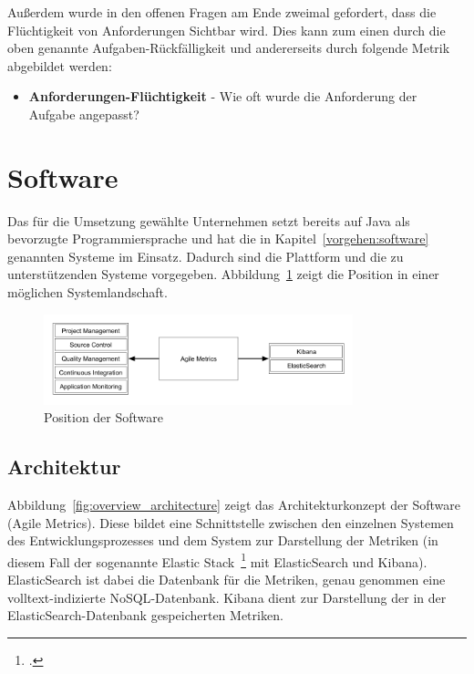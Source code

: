 Außerdem wurde in den offenen Fragen am Ende zweimal gefordert, dass die Flüchtigkeit von Anforderungen Sichtbar wird. 
Dies kann zum einen durch die oben genannte Aufgaben-Rückfälligkeit und andererseits durch folgende Metrik abgebildet werden:

\begin{itemize}[noitemsep]
    \item \textbf{Anforderungen-Flüchtigkeit} \mbox{-} Wie oft wurde die Anforderung der Aufgabe angepasst?
\end{itemize}

\newpage
\section{Software}

Das für die Umsetzung gewählte Unternehmen setzt bereits auf Java als bevorzugte Programmiersprache und hat die in Kapitel~\ref{vorgehen:software} genannten Systeme im Einsatz.
Dadurch sind die Plattform und die zu unterstützenden Systeme vorgegeben.
Abbildung~\ref{fig:position_software} zeigt die Position in einer möglichen Systemlandschaft.

\begin{savenotes}
    \begin{figure}[H] 
        \centering
            \includegraphics[width=0.8\textwidth]{img/position-overview.png}
        \caption{Position der Software}\label{fig:position_software}
    \end{figure}
\end{savenotes}

\subsection{Architektur}

Abbildung~\ref{fig:overview_architecture} zeigt das Architekturkonzept der Software (Agile Metrics).
Diese bildet eine Schnittstelle zwischen den einzelnen Systemen des Entwicklungsprozesses und dem System zur Darstellung der Metriken (in diesem Fall der sogenannte Elastic Stack~\footcite{elastic_stack} mit ElasticSearch und Kibana).
ElasticSearch ist dabei die Datenbank für die Metriken, genau genommen eine volltext-indizierte \ac{NoSQL}-Datenbank.
Kibana dient zur Darstellung der in der ElasticSearch-Datenbank gespeicherten Metriken.

